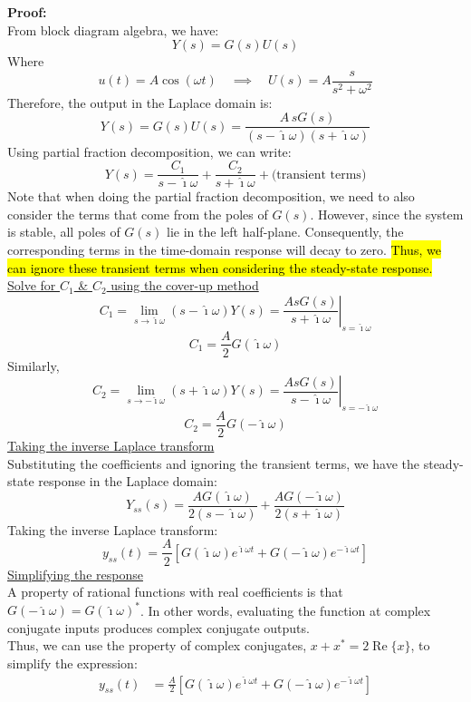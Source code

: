 ﻿\documentclass[12pt]{article}
\begin{document}
\begin{tcolorbox}[breakable, colback=white, colframe=black]
\textbf{Proof:}\\
From block diagram algebra, we have:
\[Y(s) = G(s)U(s)\]
Where
\[u(t) = A \cos(\omega t)\quad \implies \quad U(s) = A \frac{s}{s^2 + \omega^2}\]
Therefore, the output in the Laplace domain is:
\[Y(s) = G(s)U(s) = \frac{A\,sG(s)}{(s-\hat{\imath}\omega)(s+\hat{\imath}\omega)}\]
Using partial fraction decomposition, we can write:
\[Y(s) = \frac{C_1}{s-\hat{\imath}\omega} + \frac{C_2}{s+\hat{\imath}\omega} + \text{(transient terms)}\]
Note that when doing the partial fraction decomposition, we need to also consider the terms that come from the poles of $G(s)$. However, since the system is stable, all poles of $G(s)$ lie in the left half-plane. Consequently, the corresponding terms in the time-domain response will decay to zero. \hl{Thus, we can ignore these transient terms when considering the steady-state response.}
\newpage
\underline{Solve for $C_1$ \& $C_2$ using the cover-up method}
\[C_1=\lim_{s\to \hat{\imath}\omega}(s-\hat{\imath}\omega)Y(s)=\left.\frac{AsG(s)}{s+\hat{\imath}\omega}\right|_{s=\hat{\imath}\omega}\]
\[C_1=\frac{A}{2}G(\hat{\imath}\omega)\]
Similarly,
\[C_2=\lim_{s\to -\hat{\imath}\omega}(s+\hat{\imath}\omega)Y(s)=\left.\frac{AsG(s)}{s-\hat{\imath}\omega}\right|_{s=-\hat{\imath}\omega}\]
\[C_2=\frac{A}{2}G(-\hat{\imath}\omega)\]
\underline{Taking the inverse Laplace transform}\\
Substituting the coefficients and ignoring the transient terms, we have the steady-state response in the Laplace domain:
\[Y_{ss}(s)=\frac{AG(\hat{\imath}\omega)}{2(s-\hat{\imath}\omega)}+\frac{AG(-\hat{\imath}\omega)}{2(s+\hat{\imath}\omega)}\]
Taking the inverse Laplace transform:
\[y_{ss}(t)=\frac{A}{2}\left[G(\hat{\imath}\omega)e^{\hat{\imath}\omega t}+G(-\hat{\imath}\omega)e^{-\hat{\imath}\omega t}\right]\]
\underline{Simplifying the response}\\
A property of rational functions with real coefficients is that $G(-\hat{\imath}\omega)=G(\hat{\imath}\omega)^*$. In other words, evaluating the function at complex conjugate inputs produces complex conjugate outputs.\\
Thus, we can use the property of complex conjugates, $x+x^*=2\operatorname{Re}\{x\}$, to simplify the expression:
\[\begin{aligned}
y_{ss}(t)&=\frac{A}{2}\left[G(\hat{\imath}\omega)e^{\hat{\imath}\omega t}+G(-\hat{\imath}\omega)e^{-\hat{\imath}\omega t}\right]\\

\end{aligned}\]
\end{tcolorbox}
\end{document}
